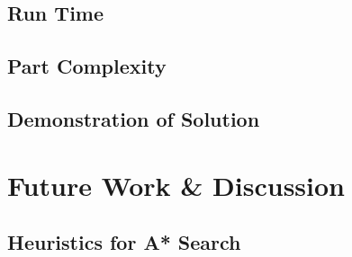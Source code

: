 	\subsection{Run Time}

	\subsection{Part Complexity}

	\subsection{Demonstration of Solution}

\section{Future Work \& Discussion}

	\subsection{Heuristics for A* Search}

